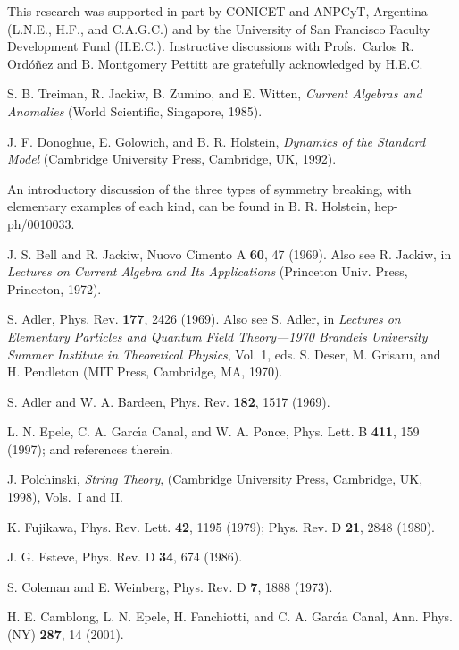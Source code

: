 \documentclass[a4paper,twocolumn,
showpacs,amssymb,aps,prl,superscriptaddress]{revtex4}%
\begin{document}
 This research was supported in part by CONICET and ANPCyT,
Argentina (L.N.E., H.F., and C.A.G.C.) and by the University of
San Francisco Faculty Development Fund (H.E.C.). Instructive
discussions with Profs.\ Carlos R. Ord\'{o}\~{n}ez and B. Montgomery
Pettitt are gratefully acknowledged by H.E.C.


\begin{thebibliography}{99}

S. B. Treiman, R. Jackiw, B. Zumino, and E. Witten, {\em Current
Algebras and Anomalies\/} (World Scientific, Singapore, 1985).

J. F. Donoghue, E. Golowich, and B. R. Holstein, {\em Dynamics of
the Standard Model\/}  (Cambridge University Press, Cambridge, UK,
1992).

An introductory discussion of the three types of symmetry
breaking, with elementary examples of each kind, can be found in
B. R. Holstein, hep-ph/0010033.

J. S. Bell and R. Jackiw, Nuovo Cimento A {\bf 60}, 47 (1969).
Also see R. Jackiw, in {\em Lectures on Current Algebra and Its
Applications\/} (Princeton Univ. Press, Princeton, 1972).

S. Adler, Phys. Rev. {\bf 177}, 2426 (1969). Also see S. Adler,
in {\em Lectures on Elementary Particles and Quantum Field
Theory---1970 Brandeis University Summer Institute in Theoretical
Physics\/}, Vol. 1, eds. S. Deser, M. Grisaru, and H. Pendleton
(MIT Press,  Cambridge, MA, 1970).

 S. Adler and W. A.
Bardeen, Phys. Rev. {\bf 182}, 1517 (1969).

L. N. Epele, C. A. Garc\'{\i}a Canal, and W. A. Ponce,
 Phys. Lett. B {\bf 411}, 159 (1997);
 and references therein.

J. Polchinski, {\em String Theory\/}, 
(Cambridge
University Press, Cambridge, UK, 1998), Vols.\ I and II.

K. Fujikawa, Phys. Rev. Lett. {\bf 42}, 1195 (1979); Phys. Rev. D
{\bf 21}, 2848 (1980).

J. G. Esteve, Phys. Rev. D {\bf 34}, 674 (1986).

S. Coleman and E. Weinberg,
 Phys. Rev. D {\bf 7},  1888 (1973).

H. E. Camblong, L. N. Epele, H. Fanchiotti, and C. A. Garc\'{\i}a
Canal, Ann. Phys. (NY) {\bf 287}, 14 (2001).


\end{thebibliography}
\end{document}
